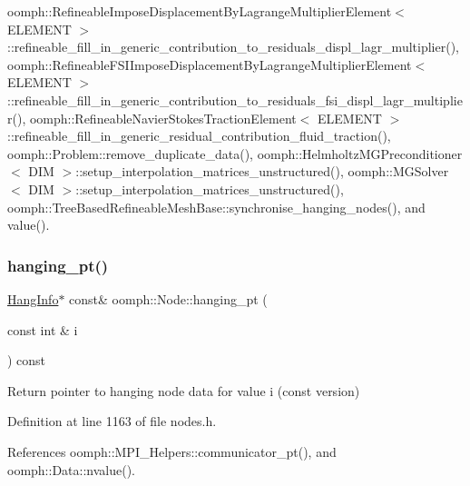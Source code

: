 oomph\+::\+Refineable\+Impose\+Displacement\+By\+Lagrange\+Multiplier\+Element$<$ E\+L\+E\+M\+E\+N\+T $>$\+::refineable\+\_\+fill\+\_\+in\+\_\+generic\+\_\+contribution\+\_\+to\+\_\+residuals\+\_\+displ\+\_\+lagr\+\_\+multiplier(), oomph\+::\+Refineable\+F\+S\+I\+Impose\+Displacement\+By\+Lagrange\+Multiplier\+Element$<$ E\+L\+E\+M\+E\+N\+T $>$\+::refineable\+\_\+fill\+\_\+in\+\_\+generic\+\_\+contribution\+\_\+to\+\_\+residuals\+\_\+fsi\+\_\+displ\+\_\+lagr\+\_\+multiplier(), oomph\+::\+Refineable\+Navier\+Stokes\+Traction\+Element$<$ E\+L\+E\+M\+E\+N\+T $>$\+::refineable\+\_\+fill\+\_\+in\+\_\+generic\+\_\+residual\+\_\+contribution\+\_\+fluid\+\_\+traction(), oomph\+::\+Problem\+::remove\+\_\+duplicate\+\_\+data(), oomph\+::\+Helmholtz\+M\+G\+Preconditioner$<$ D\+I\+M $>$\+::setup\+\_\+interpolation\+\_\+matrices\+\_\+unstructured(), oomph\+::\+M\+G\+Solver$<$ D\+I\+M $>$\+::setup\+\_\+interpolation\+\_\+matrices\+\_\+unstructured(), oomph\+::\+Tree\+Based\+Refineable\+Mesh\+Base\+::synchronise\+\_\+hanging\+\_\+nodes(), and value().

\mbox{\label{classoomph_1_1Node_a0c328b021e5eb9448920d8680d45e5c4}} 
\subsubsection{\texorpdfstring{hanging\+\_\+pt()}{hanging\_pt()}\hspace{0.1cm}{\footnotesize\ttfamily [2/2]}}
{\footnotesize\ttfamily \hyperlink{classoomph_1_1HangInfo}{Hang\+Info}$\ast$ const\& oomph\+::\+Node\+::hanging\+\_\+pt (\begin{DoxyParamCaption}\item[{const int \&}]{i }\end{DoxyParamCaption}) const\hspace{0.3cm}{\ttfamily [inline]}}



Return pointer to hanging node data for value i (const version) 



Definition at line 1163 of file nodes.\+h.



References oomph\+::\+M\+P\+I\+\_\+\+Helpers\+::communicator\+\_\+pt(), and oomph\+::\+Data\+::nvalue().

\mbox{\label{classoomph_1_1Node_ad5fe8ac9dcb705612903bc6945926375}} 
